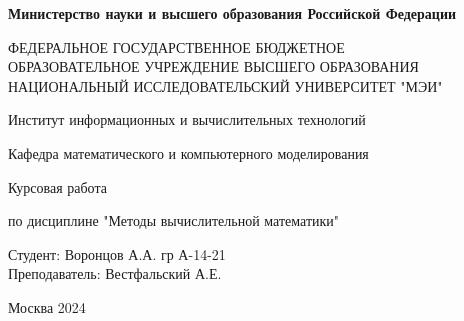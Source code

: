 \documentclass{article}
\begin{document}

\begin{titlepage}


\newpage

\begin{center}

{\bfseries Министерство науки и высшего образования Российской Федерации\\}

\vspace{1.5em}

{\bfseries

ФЕДЕРАЛЬНОЕ ГОСУДАРСТВЕННОЕ БЮДЖЕТНОЕ \\

ОБРАЗОВАТЕЛЬНОЕ УЧРЕЖДЕНИЕ ВЫСШЕГО ОБРАЗОВАНИЯ \\

НАЦИОНАЛЬНЫЙ ИССЛЕДОВАТЕЛЬСКИЙ УНИВЕРСИТЕТ "МЭИ"\ }

\vspace{1.5em}

Институт информационных и вычислительных технологий \\

\vspace{1.5em}

Кафедра математического и компьютерного моделирования

\vspace{7.5em}

\begin{center}

\Large Курсовая работа\\

\vspace{0.5em}

по дисциплине "Методы вычислительной математики"\\

\vspace{3.0em}

\end{center}

\vspace{9.0em}

\begin{flushright}

Студент:  Воронцов А.А. гр А-14-21\\

Преподаватель: Вестфальский А.Е.\\

\end{flushright}


\vspace{\fill}

\vspace{4.5em}

\begin{center}

Москва 2024

\end{center}

\end{center}

\end{titlepage}
\end{document}
